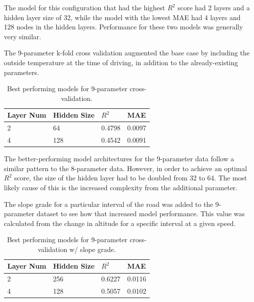 \documentclass[letterpaper]{article}
\begin{document}
The model for this configuration that had the highest $R^{2}$ score had 2 
layers and a hidden layer size of 32, while the model with the lowest MAE 
had 4 layers and 128 nodes in the hidden layers. Performance for these two 
models was generally very similar.

The 9-parameter k-fold cross validation augmented the base case by 
including the outside temperature at the time of driving, in addition to 
the already-existing parameters.

\begin{table}[]
    \begin{tabular}{|l|l|l|l|}
        \hline
        \textbf{Layer Num} & \textbf{Hidden Size} & \textbf{$R^{2}$} & \textbf{MAE} \\
        \hline
        2              	& 64               	& 0.4798  	& 0.0097   	\\
        4              	& 128              	& 0.4542  	& 0.0091 	\\
        \hline
    \end{tabular}
    \caption{Best performing models for 9-parameter cross-validation.}
    \label{tab:tb2}
\end{table}

The better-performing model architectures for the 9-parameter data follow 
a similar pattern to the 8-parameter data. However, in order to achieve an 
optimal $R^{2}$ score, the size of the hidden layer had to be doubled from 
32 to 64. The most likely cause of this is the increased complexity from 
the additional parameter.

The slope grade for a particular interval of the road was added to the 
9-parameter dataset to see how that increased model performance. This 
value was calculated from the change in altitude for a specific interval 
at a given speed.

\begin{table}[]
    \begin{tabular}{|l|l|l|l|}
        \hline
        \textbf{Layer Num} & \textbf{Hidden Size} & \textbf{$R^{2}$} & \textbf{MAE} \\
        \hline
        2              	& 256              	& 0.6227  	& 0.0116   	\\
        4              	& 128              	& 0.5057  	& 0.0102 	\\
        \hline 
    \end{tabular}
    \caption{Best performing models for 9-parameter cross-validation w/ slope grade.}
    \label{tab:tb3}
\end{table}
\end{document}

